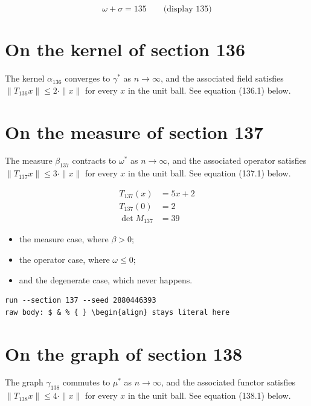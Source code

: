 \documentclass{article}
\begin{document}
$$
\omega + \sigma = 135 \qquad \text{(display 135)}
$$

\section{On the kernel of section 136}
The kernel $\alpha_{136}$ converges to $\gamma^{*}$ as $n \to \infty$,
and the associated field satisfies $\|T_{136} x\| \leq 2 \cdot \|x\|$
for every $x$ in the unit ball. See equation (136.1) below.

\section{On the measure of section 137}
The measure $\beta_{137}$ contracts to $\omega^{*}$ as $n \to \infty$,
and the associated operator satisfies $\|T_{137} x\| \leq 3 \cdot \|x\|$
for every $x$ in the unit ball. See equation (137.1) below.

\begin{align}
T_{137}(x) &= 5 x + 2 \\
T_{137}(0) &= 2 \\
\det M_{137} &= 39
\end{align}

\begin{itemize}
  \item the measure case, where $\beta > 0$;
  \item the operator case, where $\omega \leq 0$;
  \item and the degenerate case, which never happens.
\end{itemize}

\begin{verbatim}
run --section 137 --seed 2880446393
raw body: $ & % { } \begin{align} stays literal here
\end{verbatim}

\section{On the graph of section 138}
The graph $\gamma_{138}$ commutes to $\mu^{*}$ as $n \to \infty$,
and the associated functor satisfies $\|T_{138} x\| \leq 4 \cdot \|x\|$
for every $x$ in the unit ball. See equation (138.1) below.
\end{document}
